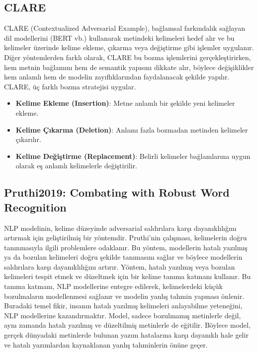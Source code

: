\newpage

\subsection{CLARE}

CLARE (Contextualized Adversarial Example), bağlamsal farkındalık sağlayan dil modellerini (BERT vb.) kullanarak metindeki kelimeleri hedef alır ve bu kelimeler üzerinde kelime ekleme, çıkarma veya değiştirme gibi işlemler uygulanır. Diğer yöntemlerden farklı olarak, CLARE bu bozma işlemlerini gerçekleştirirken, hem metnin bağlamını hem de semantik yapısını dikkate alır, böylece değişiklikler hem anlamlı hem de modelin zayıflıklarından faydalanacak şekilde yapılır. CLARE, üç farklı bozma stratejisi uygular.

\begin{itemize}
    \item \textbf{Kelime Ekleme (Insertion)}: Metne anlamlı bir şekilde yeni kelimeler ekleme.
    \item \textbf{Kelime Çıkarma (Deletion)}: Anlamı fazla bozmadan metinden kelimeler çıkarılır.
    \item \textbf{Kelime Değiştirme (Replacement)}: Belirli kelimeler bağlamlarına uygun olarak eş anlamlı kelimelerle değiştirilir.
\end{itemize}

\newpage

\subsection{Pruthi2019: Combating with Robust Word Recognition}

NLP modelinin, kelime düzeyinde adversarial saldırılara karşı dayanıklılığını artırmak için geliştirilmiş bir yöntemdir. Pruthi'nin çalışması, kelimelerin doğru tanınmasıyla ilgili problemlere odaklanır. Bu yöntem, modellerin hatalı yazılmış ya da bozulan kelimeleri doğru şekilde tanımasını sağlar ve böylece modellerin saldırılara karşı dayanıklılığını artırır. Yöntem, hatalı yazılmış veya bozulan kelimeleri tespit etmek ve düzeltmek için bir kelime tanıma katmanı kullanır. Bu tanıma katmanı, NLP modellerine entegre edilerek, kelimelerdeki küçük bozulmaların modellenmesi sağlanır ve modelin yanlış tahmin yapması önlenir. Buradaki temel fikir, insanın hatalı yazılmış kelimeleri anlayabilme yeteneğini, NLP modellerine kazandırmaktır. Model, sadece bozulmamış metinlerle değil, aynı zamanda hatalı yazılmış ve düzeltilmiş metinlerle de eğitilir. Böylece model, gerçek dünyadaki metinlerde bulunan yazım hatalarına karşı dayanıklı hale gelir ve hatalı yazımlardan kaynaklanan yanlış tahminlerin önüne geçer.

